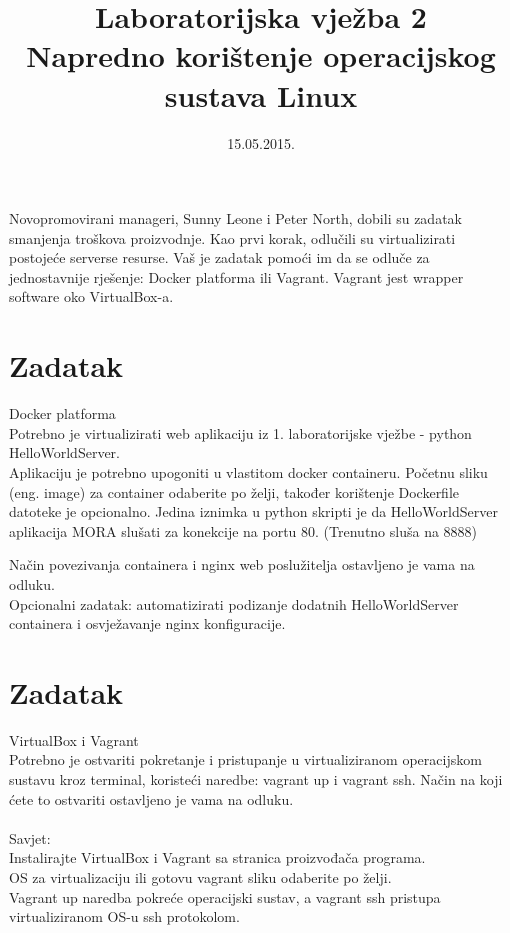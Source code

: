 \documentclass[12pt,a4paper]{article}
\begin{document}
	\title{Laboratorijska vježba 2\\{\large Napredno korištenje operacijskog sustava Linux}}
	\date{\vspace{-5ex} 15.05.2015.}
	\maketitle
	
        Novopromovirani manageri, Sunny Leone i Peter North, dobili su zadatak smanjenja troškova proizvodnje. Kao prvi korak, odlučili su virtualizirati postojeće serverse resurse.
        Vaš je zadatak pomoći im da se odluče za jednostavnije rješenje: Docker platforma ili Vagrant.
        Vagrant jest wrapper software oko VirtualBox-a.
        
	
	\section*{Zadatak}
	
        Docker platforma \\
        
        Potrebno je virtualizirati web aplikaciju iz 1. laboratorijske vježbe - python HelloWorldServer.\\
        Aplikaciju je potrebno upogoniti u vlastitom docker containeru. Početnu sliku (eng. image) za container odaberite po želji, također korištenje Dockerfile datoteke je opcionalno.
        Jedina iznimka u python skripti je da HelloWorldServer aplikacija MORA slušati za konekcije na portu 80. (Trenutno sluša na 8888)
        
        Način povezivanja containera i nginx web poslužitelja ostavljeno je vama na odluku.\\
        Opcionalni zadatak: automatizirati podizanje dodatnih HelloWorldServer containera i osvježavanje nginx konfiguracije.

        \section*{Zadatak}

        VirtualBox i Vagrant \\

        Potrebno je ostvariti pokretanje i pristupanje u virtualiziranom operacijskom sustavu kroz terminal, koristeći naredbe: vagrant up i vagrant ssh.
        Način na koji ćete to ostvariti ostavljeno je vama na odluku. \\
        \\
        Savjet: \\
        Instalirajte VirtualBox i Vagrant sa stranica proizvođača programa. \\
        OS za virtualizaciju ili gotovu vagrant sliku odaberite po želji. \\
        Vagrant up naredba pokreće operacijski sustav, a vagrant ssh pristupa virtualiziranom OS-u ssh protokolom. \\
\end{document}
